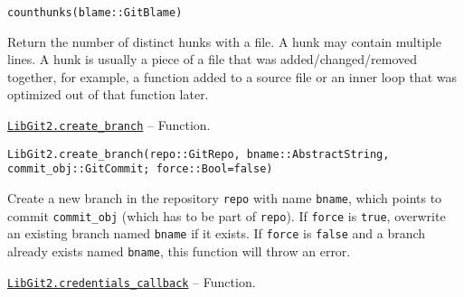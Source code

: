 \begin{adjustwidth}{2em}{0pt}


\begin{verbatim}
counthunks(blame::GitBlame)
\end{verbatim}

Return the number of distinct {\textquotedbl}hunks{\textquotedbl} with a file. A hunk may contain multiple lines. A hunk is usually a piece of a file that was added/changed/removed together, for example, a function added to a source file or an inner loop that was optimized out of that function later.



\end{adjustwidth}
\hypertarget{3632112326305021926}{}
\hyperlink{3632112326305021926}{\texttt{LibGit2.create\_branch}}  -- {Function.}

\begin{adjustwidth}{2em}{0pt}


\begin{verbatim}
LibGit2.create_branch(repo::GitRepo, bname::AbstractString, commit_obj::GitCommit; force::Bool=false)
\end{verbatim}

Create a new branch in the repository \texttt{repo} with name \texttt{bname}, which points to commit \texttt{commit\_obj} (which has to be part of \texttt{repo}). If \texttt{force} is \texttt{true}, overwrite an existing branch named \texttt{bname} if it exists. If \texttt{force} is \texttt{false} and a branch already exists named \texttt{bname}, this function will throw an error.



\end{adjustwidth}
\hypertarget{14873190507178513691}{}
\hyperlink{14873190507178513691}{\texttt{LibGit2.credentials\_callback}}  -- {Function.}

